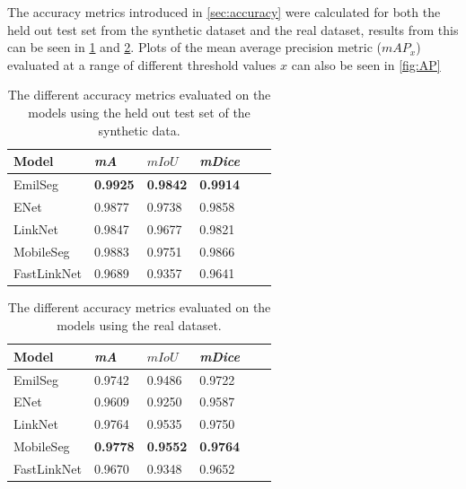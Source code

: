 \documentclass{kththesis}
\begin{document}
The accuracy metrics introduced in \cref{sec:accuracy} were calculated for both
the held out test set from the synthetic dataset and the real dataset, results
from this can be seen in \cref{tab:res_performance_test} and
\cref{tab:res_performance_real}. Plots of the mean average precision metric
(\(mAP_x\)) evaluated at a range of different threshold values \(x\) can also be
seen in \cref{fig:AP} 

\begin{table}[]
\centering
\caption{The different accuracy metrics evaluated on the models using the held
  out test set of the synthetic data.}
\label{tab:res_performance_test}
\begin{tabular}{@{}llllll@{}}
\toprule
Model       & \textit{mA} & \(\textit{m}IoU\) & \textit{mDice}  \\ \midrule
  EmilSeg    & \textbf{0.9925} & \textbf{0.9842} & \textbf{0.9914}\\
ENet       & 0.9877 & 0.9738 & 0.9858 \\
LinkNet    & 0.9847 & 0.9677 & 0.9821 \\
MobileSeg   & 0.9883 & 0.9751 & 0.9866 \\
FastLinkNet  & 0.9689 & 0.9357 & 0.9641 \\\bottomrule
\end{tabular}
\end{table}

\begin{table}[]
\centering
\caption{The different accuracy metrics evaluated on the models using the real dataset.}
\label{tab:res_performance_real}
\begin{tabular}{@{}llllll@{}}
\toprule
Model       & \textit{mA} & \(\textit{m}IoU\) & \textit{mDice}  \\ \midrule
EmilSeg    & 0.9742 & 0.9486 & 0.9722\\
ENet       & 0.9609 & 0.9250 & 0.9587 \\
LinkNet    & 0.9764 & 0.9535 & 0.9750 \\
  MobileSeg   & \textbf{0.9778} & \textbf{0.9552} & \textbf{0.9764} \\
FastLinkNet  & 0.9670 & 0.9348 & 0.9652 \\\bottomrule
\end{tabular}
\end{table}
\end{document}
